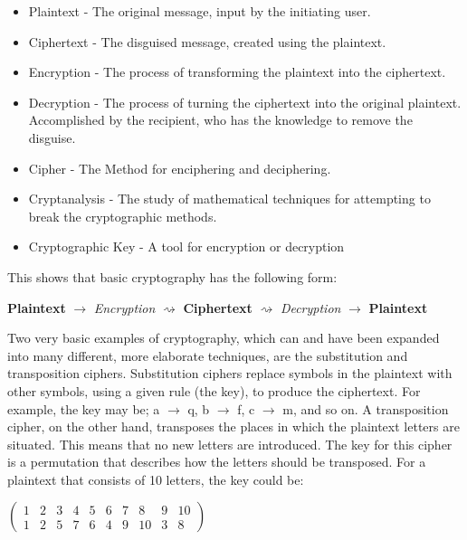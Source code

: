 \documentclass[a4paper,12pt]{report}
\begin{document}
\begin{itemize}
 \item Plaintext - The original message, input by the initiating user.
 \item Ciphertext - The disguised message, created using the plaintext.
 \item Encryption - The process of transforming the plaintext into the ciphertext.
 \item Decryption - The process of turning the ciphertext into the original plaintext. Accomplished by the recipient, who has the knowledge to remove the disguise.
 \item Cipher - The Method for enciphering and deciphering.
 \item Cryptanalysis - The study of mathematical techniques for attempting to break the cryptographic methods.
 \item Cryptographic Key - A tool for encryption or decryption
\end{itemize}

\noindent
This shows that basic cryptography has the following form:

\begin{center}

  \textbf{Plaintext} $\rightarrow$ \emph{Encryption} $\rightsquigarrow$ \textbf{Ciphertext} $\rightsquigarrow$ \emph{Decryption} $\rightarrow$ \textbf{Plaintext}

\end{center}

\noindent
Two very basic examples of cryptography, which can and have been expanded into many different, more elaborate techniques, are the substitution and transposition ciphers. Substitution ciphers replace symbols in the plaintext with other symbols, using a given rule (the key), to produce the ciphertext. For example, the key may be; a $\rightarrow$ q, b $\rightarrow$  f, c $\rightarrow$  m, and so on. A transposition cipher, on the other hand, transposes the places in which the plaintext letters are situated. This means that no new letters are introduced. The key for this cipher is a permutation that describes how the letters should be transposed. For a plaintext that consists of 10 letters, the key could be:

\begin{center}
$
\begin{pmatrix}
  1 & 2 & 3 & 4 & 5 & 6 & 7 & 8 & 9 & 10 \\
  1 & 2 & 5 & 7 & 6 & 4 & 9 & 10 & 3 & 8
 \end{pmatrix}
$
\end{center}
\end{document}
